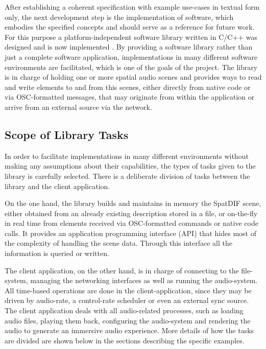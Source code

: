 \documentclass{article}
\begin{document}
After establishing a coherent specification with example use-cases in textual form only, the next development step is the implementation of software, which embodies the specified concepts and should serve as a reference for future work.
For this purpose a platform-independent software library written in C/C++ was designed and is now implemented \cite{Miyama_2013}.
By providing a software library rather than just a complete software application, implementations in many different software environments are facilitated, which is one of the goals of the project.
The library is in charge of holding one or more spatial audio scenes and provides ways to read and write elements to and from this scenes, either directly from native code or via OSC-formatted messages, that may originate from within the application or arrive from an external source via the network.

\subsection{Scope of Library Tasks}\label{subsec:separation}

In order to facilitate implementations in many different environments without making any assumptions about their capabilities, the types of tasks given to the library is carefully selected.
There is a deliberate division of tasks between the library and the client application.

On the one hand, the library builds and maintains in memory the SpatDIF scene, either obtained from an already existing description stored in a file, or on-the-fly in real time from elements received via OSC-formatted commands or native code calls.
It provides an application programming interface (API) that hides most of the complexity of handling the scene data.
Through this interface all the information is queried or written.

The client application, on the other hand, is in charge of connecting to the file-system, managing the networking interfaces as well as running the audio-system.
All time-based operations are done in the client-application, since they may be driven by audio-rate, a control-rate scheduler or even an external sync source. 
The client application deals with all audio-related processes, such as loading audio files, playing them back, configuring the audio-system and rendering the audio to generate an immersive audio experience.
More details of how the tasks are divided are shown below in the sections describing the specific examples.
\end{document}

